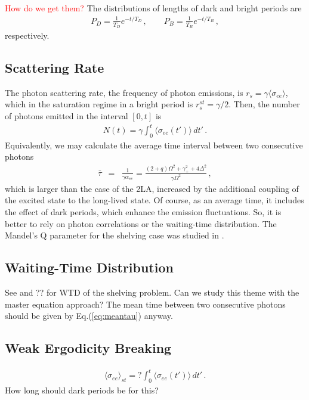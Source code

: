\documentclass[twocolumn,aps,eqsecnum,showkeys,amsmath]{revtex4-2}
\begin{document}
\textcolor{red}{How do we get them?} 
The distributions of lengths of dark and bright periods are 
%
\begin{eqnarray}    
P_D = \frac{1}{T_D} e^{-t/T_D}	 \,, 	\qquad 
	P_B = \frac{1}{T_B} e^{-t/T_B}	\,, 
\end{eqnarray}
respectively.

\subsection{Scattering Rate} 
The photon scattering rate, the frequency of photon emissions, is 
$r_s =\gamma \langle \sigma_{ee} \rangle$, which in the saturation regime 
in a bright period is $r_s^{st}=\gamma/2$. Then, the number of photons 
emitted in the  interval $[0,t]$ is 
%
\begin{eqnarray} 
N(t) = \gamma \int_0^t \langle \sigma_{ee} (t') \rangle \, dt' \,.
\end{eqnarray}
Equivalently, we may calculate the average time interval between two 
consecutive photons 
%
\begin{eqnarray} 	\label{eq:meantau}
 \bar{\tau} &=& \frac{1}{\gamma \alpha_{ee} } 
	=\frac{(2 +q)\Omega^2 +\gamma_+^2 +4 \Delta^2}
	{\gamma \Omega^2} 	\,,		
\end{eqnarray}
which is larger than the case of the 2LA, increased by the additional coupling 
of the excited state to the long-lived state. Of course, as an average time, it 
includes the effect of dark periods, which enhance the emission fluctuations. 
So, it is better to rely on photon correlations or the waiting-time distribution. 
The Mandel's Q parameter for the shelving case was studied in 
\cite{MeSc90}.  

\subsection{Waiting-Time Distribution} 
See \cite{CTDa86} and ?? for WTD of the shelving problem. Can we study 
this theme with the master equation approach? The mean time between 
two consecutive photons should be given by Eq.(\ref{eq:meantau}) anyway.

\subsection{Weak Ergodicity Breaking} 
%
\begin{eqnarray} 
\langle \sigma_{ee} \rangle_{st} 
	=? \int_0^t \langle \sigma_{ee} (t') \rangle \, dt' \,.
\end{eqnarray}
How long should dark periods be for this?
\end{document}
